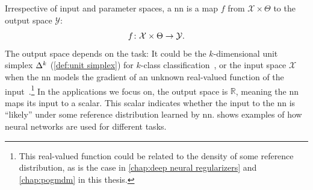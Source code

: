 Irrespective of input and parameter spaces, a \gls{nn} is a map \( f \)  from \( \mathcal{X} \times \Theta \) to the output space \( \mathcal{Y} \):
\begin{equation}
	f \colon \mathcal{X} \times \Theta \to \mathcal{Y}.
\end{equation}
The output space depends on the task:
It could be the \( k \)-dimensional unit simplex \( \Delta^k \) (\cref{def:unit simplex}) for \( k \)-class classification~\cite{OU20074}, or the input space \( \mathcal{X} \) when the \gls{nn} models the gradient of an unknown real-valued function of the input~\cite{chung_scoremri_2022,song2021scorebased}.\footnote{%
	This real-valued function could be related to the density of some reference distribution, as is the case in \cref{chap:deep neural regularizers} and \cref{chap:pogmdm} in this thesis.
}
In the applications we focus on, the output space is \( \mathbb{R} \), meaning the \gls{nn} maps its input to a scalar.
This scalar indicates whether the input to the \gls{nn} is \enquote{likely} under some reference distribution learned by \gls{nn}.
 shows examples of how neural networks are used for different tasks.
